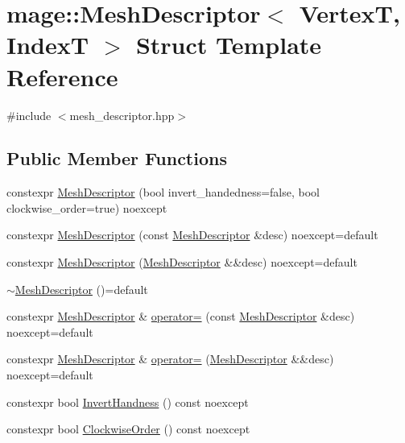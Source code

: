 \hypertarget{structmage_1_1_mesh_descriptor}{}\section{mage\+:\+:Mesh\+Descriptor$<$ VertexT, IndexT $>$ Struct Template Reference}
\label{structmage_1_1_mesh_descriptor}


{\ttfamily \#include $<$mesh\+\_\+descriptor.\+hpp$>$}

\subsection*{Public Member Functions}
\begin{DoxyCompactItemize}
\item 
constexpr \hyperlink{structmage_1_1_mesh_descriptor_aab7cab220ecd16b78209000664c74231}{Mesh\+Descriptor} (bool invert\+\_\+handedness=false, bool clockwise\+\_\+order=true) noexcept
\item 
constexpr \hyperlink{structmage_1_1_mesh_descriptor_a5265ab6ae614b082d91e41f6117ce15f}{Mesh\+Descriptor} (const \hyperlink{structmage_1_1_mesh_descriptor}{Mesh\+Descriptor} \&desc) noexcept=default
\item 
constexpr \hyperlink{structmage_1_1_mesh_descriptor_af19be91547fed5b9b2be4ac23fb71ef4}{Mesh\+Descriptor} (\hyperlink{structmage_1_1_mesh_descriptor}{Mesh\+Descriptor} \&\&desc) noexcept=default
\item 
\hyperlink{structmage_1_1_mesh_descriptor_a7a2998a335d355ea366df8df1b1df0e5}{$\sim$\+Mesh\+Descriptor} ()=default
\item 
constexpr \hyperlink{structmage_1_1_mesh_descriptor}{Mesh\+Descriptor} \& \hyperlink{structmage_1_1_mesh_descriptor_a022e345285b4d307e69ddafe6a478a97}{operator=} (const \hyperlink{structmage_1_1_mesh_descriptor}{Mesh\+Descriptor} \&desc) noexcept=default
\item 
constexpr \hyperlink{structmage_1_1_mesh_descriptor}{Mesh\+Descriptor} \& \hyperlink{structmage_1_1_mesh_descriptor_abc2aa63cc03fd7b7ca736129bd5bc0fd}{operator=} (\hyperlink{structmage_1_1_mesh_descriptor}{Mesh\+Descriptor} \&\&desc) noexcept=default
\item 
constexpr bool \hyperlink{structmage_1_1_mesh_descriptor_a570ac8d10bafca62cc24226434c817e8}{Invert\+Handness} () const noexcept
\item 
constexpr bool \hyperlink{structmage_1_1_mesh_descriptor_a4694588682a42e5abf7c10e33a48d9bf}{Clockwise\+Order} () const noexcept
\end{DoxyCompactItemize}
